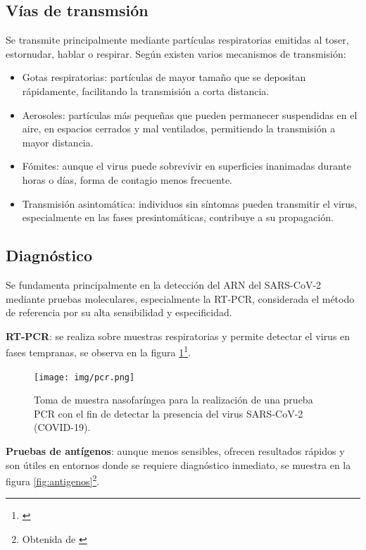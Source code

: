 \subsection{Vías de transmsión}
Se transmite principalmente mediante partículas respiratorias emitidas al toser, estornudar, hablar o respirar. Según \cite{wiersinga2020covid19}existen varios mecanismos de transmisión:
\begin{itemize}
    \item Gotas respiratorias: partículas de mayor tamaño que se depositan rápidamente, facilitando la transmisión a corta distancia.
    \item Aerosoles: partículas más pequeñas que pueden permanecer suspendidas en el aire, en espacios cerrados y mal ventilados, permitiendo la transmisión a mayor distancia.
    \item Fómites: aunque el virus puede sobrevivir en superficies inanimadas durante horas o días, forma de contagio menos frecuente.
    \item Transmisión asintomática: individuos sin síntomas pueden transmitir el virus, especialmente en las fases presintomáticas, contribuye a su propagación.
\end{itemize}

\subsection{Diagnóstico}
Se fundamenta principalmente \cite{ko2022covid} en la detección del ARN del SARS-CoV-2 mediante pruebas moleculares, especialmente la RT-PCR, considerada el método de referencia por su alta sensibilidad y especificidad.

\textbf{RT-PCR}: se realiza sobre muestras respiratorias y permite detectar el virus en fases tempranas, se observa en la figura \ref{fig:PCR}\footnote{\cite{comunidadmadrid2020pcr}}.

\begin{figure}[H]
        \centering
        \texttt{[image: img/pcr.png]}
        \caption{Toma de muestra nasofaríngea para la realización de una prueba PCR con el fin de detectar la presencia del virus SARS-CoV-2 (COVID-19).}
        \label{fig:PCR}
        \vspace{0.5cm} %
\end{figure}

\textbf{Pruebas de antígenos}: aunque menos sensibles, ofrecen resultados rápidos y son útiles en entornos donde se requiere diagnóstico inmediato, se muestra en la figura \ref{fig:antigenos}\footnote{Obtenida de \cite{ceydes_antigeno}}.

